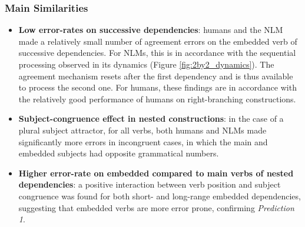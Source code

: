 \subsubsection{Main Similarities}
\begin{itemize}
    \item \textbf{Low error-rates on successive dependencies}: humans and the NLM made a relatively small number of agreement errors on the embedded verb of successive dependencies. For NLMs, this is in accordance with the sequential processing observed in its dynamics (Figure \ref{fig:2by2_dynamics}). The agreement mechanism resets after the first dependency and is thus available to process the second one. For humans, these findings are in accordance with the relatively good performance of humans on right-branching constructions.
    \item \textbf{Subject-congruence effect in nested constructions}: in the case of a plural subject attractor, for all verbs, both humans and NLMs made significantly more errors in incongruent cases, in which the main and embedded subjects had opposite grammatical numbers.
    \item \textbf{Higher error-rate on embedded compared to main verbs of nested dependencies}: a positive interaction between verb position and subject congruence was found for both short- and long-range embedded dependencies, suggesting that embedded verbs are more error prone, confirming \textit{Prediction 1}.

    
\end{itemize}

